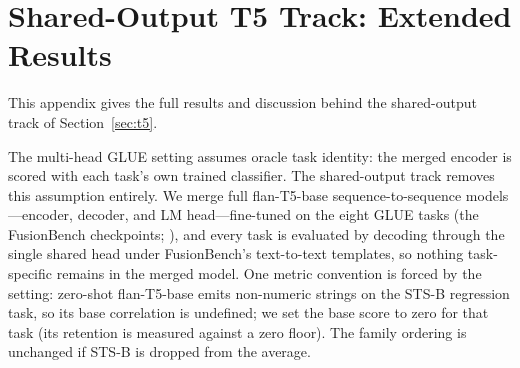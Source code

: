 \documentclass{article} %
\begin{document}
\fi

\iffalse
\section{Shared-Output T5 Track: Extended Results}
\label{app:t5}

This appendix gives the full results and discussion behind the shared-output track of Section~\ref{sec:t5}.

The multi-head GLUE setting assumes oracle task identity: the merged encoder is scored with each task's own trained classifier. The shared-output track removes this assumption entirely. We merge full flan-T5-base sequence-to-sequence models---encoder, decoder, and LM head---fine-tuned on the eight GLUE tasks (the FusionBench checkpoints; \citealp{raffel2020t5,tang2024fusionbench}), and every task is evaluated by decoding through the single shared head under FusionBench's text-to-text templates, so nothing task-specific remains in the merged model. One metric convention is forced by the setting: zero-shot flan-T5-base emits non-numeric strings on the STS-B regression task, so its base correlation is undefined; we set the base score to zero for that task (its retention is measured against a zero floor). The family ordering is unchanged if STS-B is dropped from the average.
\end{document}
